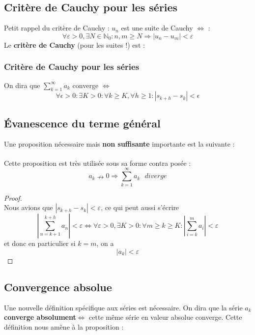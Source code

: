 \documentclass[british,french,11pt, a4paper, openany]{book}
\begin{document}
\subsection{Critère de Cauchy pour les séries}
Petit rappel du critère de Cauchy : $u_n$ est une suite de Cauchy $\Leftrightarrow$ :
\begin{equation}
	\forall \varepsilon > 0, \exists N \in \mathbb{N}_0 : n,m \geq N \Rightarrow |u_n - u_m| < \varepsilon
\end{equation}
Le \textbf{critère de Cauchy} (pour les suites !) est : \\
		
\subsubsection{Critère de Cauchy pour les séries}
On dira que $\sum_{k=1}^\infty a_k$ converge $\Leftrightarrow$
\begin{equation}
	\forall \epsilon > 0 : \exists K > 0 : \forall k \geq K, \forall h \geq 1 : |s_{k+h} - s_k| < \epsilon
\end{equation}
		
\subsection{Évanescence du terme général}
Une proposition nécessaire mais \textbf{non suffisante} importante est la suivante : \\
		
\ \\
		
Cette proposition est très utilisée sous sa forme contra posée :
\begin{equation}
	a_k \nrightarrow 0 \Rightarrow \sum_{k=1}^\infty a_k\ \ \ diverge
\end{equation}
\begin{proof}\ \\
	Nous avions que $|s_{k+h} - s_k| < \varepsilon$, ce qui peut aussi s'écrire $$\left|\sum_{n=k+1}^{k+h}a_n\right| < \varepsilon\Leftrightarrow\forall\varepsilon>0,\exists K>0:\forall m\geq k\geq K : \left|\sum_{i=k}^ma_i\right|<\varepsilon$$ et donc en particulier si $k=m$, on a $$|a_k|<\varepsilon$$
\end{proof}
\subsection{Convergence absolue}
Une nouvelle définition spécifique aux séries est nécessaire. On dira que la série $a_k$ \textbf{converge absolument}$\Leftrightarrow$ cette même série en valeur absolue converge. Cette définition nous amène à la proposition :
		
\end{document}
